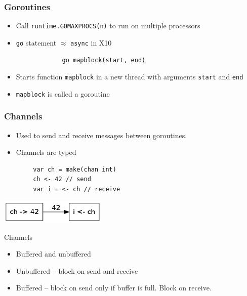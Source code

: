 \documentclass{beamer}
\begin{document}
\begin{frame} [fragile]
\frametitle{Goroutines}
\begin{itemize}
  \item Call \verb=runtime.GOMAXPROCS(n)= to run on multiple processors
  \item \verb=go= statement $\approx$ \verb=async= in X10
\end{itemize}
\begin{center}
\begin{verbatim}
                go mapblock(start, end)
\end{verbatim}
\end{center}
\begin{itemize}
\item Starts function \verb=mapblock= in a new thread with arguments \verb=start= and \verb=end=
\item \verb=mapblock= is called a goroutine
\end{itemize}

\end{frame}

\begin{frame} [fragile]
\frametitle{Channels}
\begin{itemize}
\item Used to send and receive messages between goroutines.
\item Channels are typed
\end{itemize}
\begin{verbatim}
        var ch = make(chan int) 
        ch <- 42 // send 
        var i = <- ch // receive        
\end{verbatim}
\begin{center}
\includegraphics[width=2in]{channel.png}
\end{center}
\end{frame}

\begin{frame}{Channels}

\begin{itemize}
\item Buffered and unbuffered
\item Unbuffered -- block on send and receive
\item Buffered  -- block on send only if buffer is full. Block on receive.

\end{itemize}
\end{frame}
\end{document}
